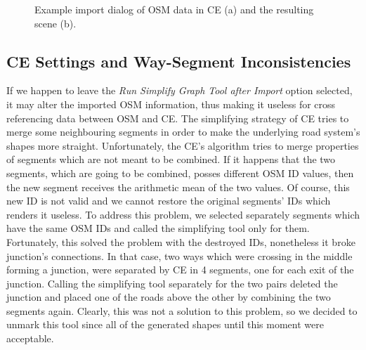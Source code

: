 \begin{figure}[htb]
	\centering
	\caption{Example import dialog of OSM data in CE (a) and the resulting scene (b).}
\end{figure}

\subsection{CE Settings and Way-Segment Inconsistencies}
If we happen to leave the \emph{Run Simplify Graph Tool after Import} option selected, it may alter the imported OSM information, thus making it useless for cross referencing data between OSM and CE. The simplifying strategy of CE tries to merge some neighbouring segments in order to make the underlying road system's shapes more straight. Unfortunately, the CE's algorithm tries to merge properties of segments which are not meant to be combined. If it happens that the two segments, which are going to be combined, posses different OSM ID values, then the new segment receives the arithmetic mean of the two values. Of course, this new ID is not valid and we cannot restore the original segments' IDs which renders it useless. To address this problem, we selected separately segments which have the same OSM IDs and called the simplifying tool only for them. Fortunately, this solved the problem with the destroyed IDs, nonetheless it broke junction's connections. In that case, two ways which were crossing in the middle forming a junction, were separated by CE in 4 segments, one for each exit of the junction. Calling the simplifying tool separately for the two pairs deleted the junction and placed one of the roads above the other by combining the two segments again. Clearly, this was not a solution to this problem, so we decided to unmark this tool since all of the generated shapes until this moment were acceptable.  

